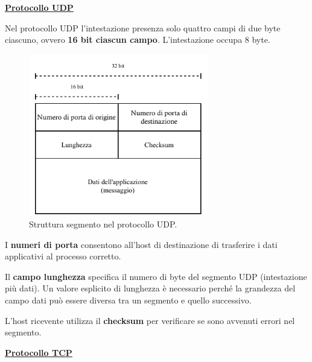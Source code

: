 \documentclass[a4paper]{article}
\begin{document}
	\noindent
	\textcolor{Red3}{\textbf{\underline{Protocollo UDP}}}\newline
	
	\noindent
	Nel protocollo UDP l'intestazione presenza solo quattro campi di due byte ciascuno, ovvero \textbf{16 bit ciascun campo}. L'intestazione occupa 8 byte.
	\begin{figure}[!htp]
		\centering
		\includegraphics[width=0.7\textwidth]{img/segmento_udp.pdf}
		\caption{Struttura segmento nel protocollo UDP.}
	\end{figure}

	\noindent
	I \textbf{numeri di porta} consentono all’host di destinazione di trasferire i dati applicativi al processo corretto.\newline

	\noindent
	Il \textbf{campo lunghezza} specifica il numero di byte del segmento UDP (intestazione più dati). Un valore esplicito di lunghezza è necessario perché la grandezza del campo dati può essere diversa tra un segmento e quello successivo.\newline
	
	\noindent
	L'host ricevente utilizza il \textbf{checksum} per verificare se sono avvenuti errori nel segmento.
	
	\newpage
	
	\noindent
	\textcolor{Red3}{\textbf{\underline{Protocollo TCP}}}\newline
	
\end{document}
